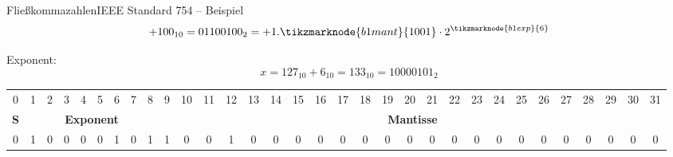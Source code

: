 \documentclass[xelatex,aspectratio=169]{beamer}
\begin{document}
\begin{frame}{Fließkommazahlen}{IEEE Standard 754 -- Beispiel}
  \[ +100_{10} = 0110 0100_{2} = + 1.\tikzmarknode{b1mant}{1001} \cdot 2^{\tikzmarknode{b1exp}{6}} \]

  Exponent:
  \[ x = 127_{10} + 6_{10} = 133_{10} = 1000 0101_{2} \]


  \setlength{\tabcolsep}{0.2em}
  \begin{tabular}{c|cccccccc|ccccccccccccccccccccccc}
    \toprule
    0                               & 1                                      & 2                                      & 3 & 4 & 5 & 6 & 7 & 8 & 9 & 10 & 11 & 12 & 13 & 14 & 15 & 16 & 17 & 18 & 19 & 20 & 21 & 22 & 23 & 24 & 25 & 26 & 27 & 28 & 29 & 30 & 31 \\
    \multicolumn{1}{c|}{\textbf{S}} & \multicolumn{8}{c|}{\textbf{Exponent}} & \multicolumn{23}{c}{\textbf{Mantisse}}                                                                                                                                           \\
    \midrule
    0                               & 1                                      & 0                                      & 0 & 0 & 0 & 1 & 0 & 1 & 1 & 0  & 0  & 1  & 0  & 0  & 0  & 0  & 0  & 0  & 0  & 0  & 0  & 0  & 0  & 0  & 0  & 0  & 0  & 0  & 0  & 0  & 0  \\
    \bottomrule
  \end{tabular}
\end{frame}
\end{document}
